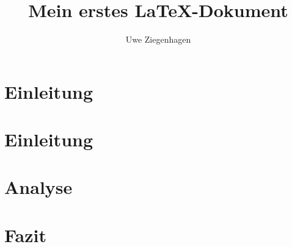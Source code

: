\documentclass[12pt,ngerman]{scrartcl}
\author{Uwe Ziegenhagen}
\title{Mein erstes LaTeX-Dokument}
\begin{document}
\maketitle

\section{Einleitung}

\section{Einleitung}

\section{Analyse}


\section{Fazit}
\end{document}
